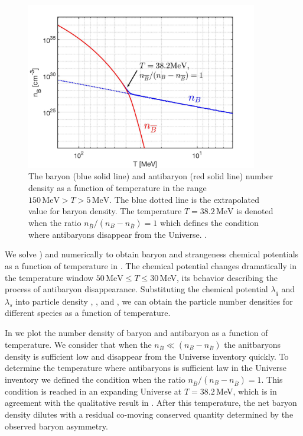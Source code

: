 \begin{figure} 
\centerline{\includegraphics[width=0.9\textwidth]{./plots/Baryon_Antibaryon_cm.jpg}}
\caption{The baryon (blue solid line) and antibaryon (red solid line) number density as a function of temperature in the range $150\,\mathrm{MeV}>T>5\,\mathrm{MeV}$. The blue dotted line is the extrapolated value for baryon density. The temperature $T=38.2\,\mathrm{MeV}$ is denoted when the ratio $n_{\overline B}/(n_B-n_{\overline B})=1$ which defines the condition where antibaryons disappear from the Universe. . }
\label{Baryon_fig}
\end{figure}


We solve  ) and  numerically to obtain baryon and strangeness chemical potentials as a function of temperature in  . The chemical potential changes dramatically in the temperature window $50\,\mathrm{MeV}\le T\le 30$\,MeV, its behavior describing the process of antibaryon disappearance. Substituting the chemical potential $\lambda_q$ and $\lambda_s$ into particle density , , and , we can obtain the particle number densities for different species as a function of temperature.

In  we plot the number density of baryon and antibaryon as a function of temperature. We consider that when the  $n_{\overline B}\ll(n_B-n_{\overline B})$ the anitbaryons density is sufficient low and disappear from the Universe inventory quickly. To determine the temperature where antibaryons is sufficient law in the Universe inventory we defined the condition when the ratio $n_{\overline B}/(n_B-n_{\overline B})=1$. This condition is reached in an expanding Universe at $T=38.2$\,MeV, which is in agreement with the qualitative result in \cite{Kolb:1990vq}. After this temperature, the net baryon density dilutes with a residual co-moving conserved quantity determined by the observed baryon asymmetry.

